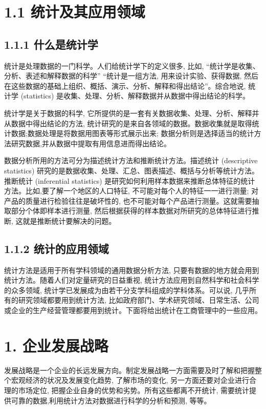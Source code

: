 \documentclass[10pt]{article}
\begin{document}
\begin{CJK*}{UTF8}{bsmi}
\section*{1.1 统计及其应用领域}
\subsection*{1.1.1 什么是统计学}
统计是处理数据的一门科学。人们给统计学下的定义很多, 比如, “统计学是收集、分析、表述和解释数据的科学” “统计是一组方法, 用来设计实验、获得数据, 然后在这些数据的基础上组织、概括、演示、分析、解释和得出结论”。综合地说, 统计学 (statistics) 是收集、处理、分析、解释数据并从数据中得出结论的科学。

统计学是关于数据的科学, 它所提供的是一套有关数据收集、处理、分析、解释并从数据中得出结论的方法, 统计研究的是来自各领域的数据。数据收集就是取得统计数据;数据处理是将数据用图表等形式展示出来; 数据分析则是选择适当的统计方法研究数据,并从数据中提取有用信息进而得出结论。

数据分析所用的方法可分为描述统计方法和推断统计方法。描述统计 (descriptive statistics) 研究的是数据收集、处理、汇总、图表描述、概括与分析等统计方法。推断统计 (inferential statistics) 是研究如何利用样本数据来推断总体特征的统计方法。比如,要了解一个地区的人口特征, 不可能对每个人的特征一一进行测量; 对产品的质量进行检验往往是破坏性的, 也不可能对每个产品进行测量。这就需要抽取部分个体即样本进行测量, 然后根据获得的样本数据对所研究的总体特征进行推断, 这就是推断统计要解决的问题。

\subsection*{1.1.2 统计的应用领域}
统计方法是适用于所有学科领域的通用数据分析方法, 只要有数据的地方就会用到统计方法。随着人们对定量研究的日益重视, 统计方法应用到自然科学和社会科学的众多领域, 统计学已发展成为由若干分支学科组成的学科体系。可以说, 几乎所有的研究领域都要用到统计方法, 比如政府部门、学术研究领域、日常生活、公司或企业的生产经营管理都要用到统计。下面将给出统计在工商管理中的一些应用。

\section*{1. 企业发展战略}
发展战略是一个企业的长远发展方向。制定发展战略一方面需要及时了解和把握整个宏观经济的状况及发展变化趋势, 了解市场的变化, 另一方面还要对企业进行合理的市场定位, 把握企业自身的优势和劣势。所有这些都离不开统计, 需要统计提供可靠的数据,利用统计方法对数据进行科学的分析和预测, 等等。


\end{CJK*}
\end{document}
